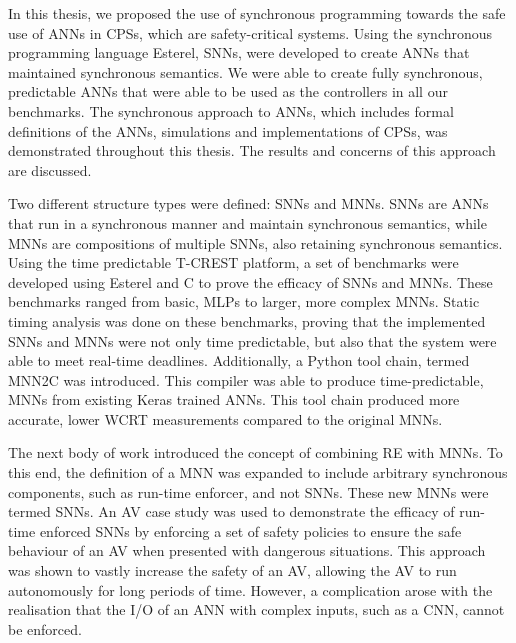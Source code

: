 In this thesis, we proposed the use of synchronous programming towards the safe use of \acfp{ANN} in \acfp{CPS}, which are safety-critical systems.
Using the synchronous programming language Esterel, \acfp{SNN}, were developed to create \acp{ANN} that maintained synchronous semantics.
We were able to create fully synchronous, predictable \acp{ANN} that were able to be used as the controllers in all our benchmarks.
The synchronous approach to \acp{ANN}, which includes formal definitions of the \acp{ANN}, simulations and implementations of \acp{CPS}, was demonstrated throughout this thesis.
The results and concerns of this approach are discussed.

Two different structure types were defined: \acp{SNN} and \acp{MNN}.
\acp{SNN} are \acp{ANN} that run in a synchronous manner and maintain synchronous semantics, while \acp{MNN} are compositions of multiple \acp{SNN}, also retaining synchronous semantics.
Using the time predictable T-CREST platform, a set of benchmarks were developed using Esterel and C to prove the efficacy of \acp{SNN} and \acp{MNN}. 
These benchmarks ranged from basic, \acfp{MLP} to larger, more complex \acfp{MNN}.
Static timing analysis was done on these benchmarks, proving that the implemented \acp{SNN} and \acp{MNN} were not only time predictable, but also that the system were able to meet real-time deadlines.
Additionally, a Python tool chain, termed \acf{MNN2C} was introduced.
This compiler was able to produce time-predictable, \acp{MNN} from existing Keras trained \acp{ANN}.
This tool chain produced more accurate, lower \acf{WCRT} measurements compared to the original \acp{MNN}.

The next body of work introduced the concept of combining \acf{RE} with \acp{MNN}.
To this end, the definition of a \ac{MNN} was expanded to include arbitrary synchronous components, such as run-time enforcer, and not \acp{SNN}.
These new \acp{MNN} were termed \acfp{SNN}.
An \ac{AV} case study was used to demonstrate the efficacy of run-time enforced \acp{SNN} by enforcing a set of safety policies to ensure the safe behaviour of an \ac{AV} when presented with dangerous situations.
This approach was shown to vastly increase the safety of an \ac{AV}, allowing the \ac{AV} to run autonomously for long periods of time.
However, a complication arose with the realisation that the I/O of an \ac{ANN} with complex inputs, such as a \acf{CNN}, cannot be enforced.

